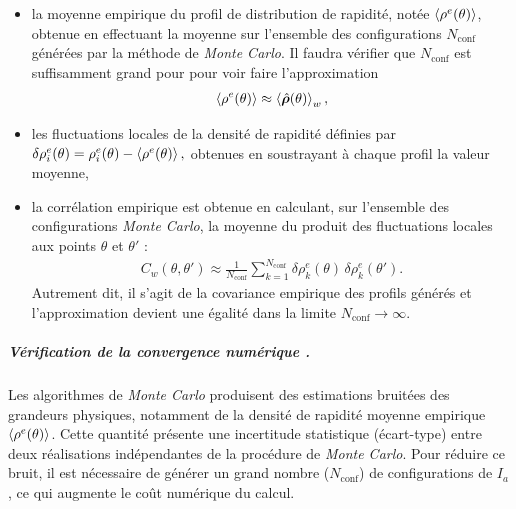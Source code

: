\begin{itemize}[label = $\bullet$]
    \item la moyenne empirique du profil de distribution de rapidité, notée
    \( \braket{\rho^e(\theta)}  \), obtenue en effectuant la moyenne sur l’ensemble des configurations \( N_{\text{conf}} \) générées par la méthode de \emph{Monte Carlo}. Il faudra vérifier que \( N_{\text{conf}} \) est suffisamment grand pour pour voir faire l'approximation
    \begin{eqnarray}\label{cahp4:eq.rho.e.1}
    	\braket{\rho^e(\theta)}  \approx \braket{\hat{\bm{\rho}}(\theta)}_w,
    \end{eqnarray}
    \item les fluctuations locales de la densité de rapidité définies par
    \(
    \delta\rho^e_i(\theta) = \rho^e_i(\theta) - \braket{\rho^e(\theta)},
    \)
    obtenues en soustrayant à chaque profil la valeur moyenne,
    \item la corrélation empirique est obtenue en calculant, sur l’ensemble des configurations \emph{Monte Carlo}, la moyenne du produit des fluctuations locales aux points \(\theta\) et \(\theta'\) :
    \begin{eqnarray}\label{cahp4:eq.corre.e.1}
    	C_w(\theta, \theta')
        \approx \frac{1}{N_{\text{conf}}} \sum_{k=1}^{N_{\text{conf}}}
        \delta \rho^e_k(\theta) \, \delta \rho^e_k(\theta').
    \end{eqnarray}
    Autrement dit, il s’agit de la covariance empirique des profils générés et l’approximation devient une égalité dans la limite \( N_{\text{conf}} \to \infty \).
\end{itemize}

\medskip

\subparagraph{Vérification de la convergence numérique .}


Les algorithmes de \emph{Monte Carlo} produisent des estimations bruitées des grandeurs physiques, notamment de la densité de rapidité moyenne empirique \( \braket{\rho^e(\theta)} \). Cette quantité présente une incertitude statistique (écart-type) entre deux réalisations indépendantes de la procédure de \emph{Monte Carlo}. Pour réduire ce bruit, il est nécessaire de générer un grand nombre ($N_{\text{conf}}$) de configurations de ${I_a}$, ce qui augmente le coût numérique du calcul.

